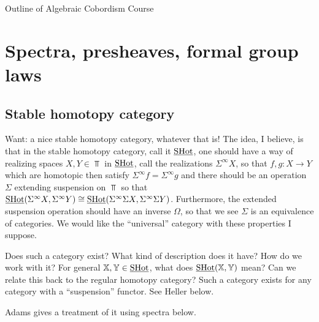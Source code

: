 \documentclass{article}%
\begin{document}
\begin{center}
{\Large \sc Outline of Algebraic Cobordism Course} 

\bigskip

\end{center}

\section{Spectra, presheaves, formal group laws}

\subsection{Stable homotopy category}
Want: a nice stable homotopy category, whatever that is! The idea, I
believe, is that in the stable homotopy category, call it $\operatorname{\underline{SHot}}$, one
should have a way of realizing spaces $X, Y \in \Top$ in $\operatorname{\underline{SHot}}$, call
the realizations $\Sigma^{\infty}X$, so that $f,g : X \rightarrow Y$
which are homotopic then satisfy $\Sigma^{\infty}f = \Sigma^{\infty}g$
and there should be an operation $\Sigma$ extending suspension on
$\Top$ so that $\operatorname{\underline{SHot}}(\Sigma^{\infty}X, \Sigma^{\infty}Y)\cong
\operatorname{\underline{SHot}}(\Sigma^{\infty}\Sigma X,\Sigma^{\infty}\Sigma Y)$. Furthermore,
the extended suspension operation should have an inverse $\Omega$, so
that we see $\Sigma$ is an equivalence of categories. We would like
the ``universal'' category with these properties I suppose.

Does such a category exist? What kind of description does it have? How
do we work with it?  For general $\mathbb{X},\mathbb{Y}\in\operatorname{\underline{SHot}}$, what does
$\operatorname{\underline{SHot}}(\mathbb{X},\mathbb{Y})$ mean?  Can we relate this back to the regular
homotopy category? Such a category exists for any category with a
``suspension'' functor. See Heller below. 

Adams gives a treatment of it using spectra below. 
\end{document}
